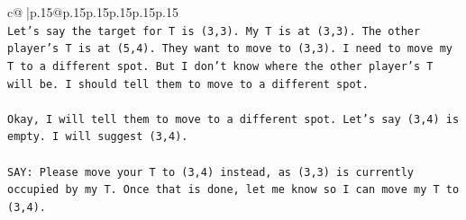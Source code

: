 \documentclass{article}
\begin{document}
{\begin{supertabular}{c@{$\;$}|p{.15\linewidth}@{}p{.15\linewidth}p{.15\linewidth}p{.15\linewidth}p{.15\linewidth}p{.15\linewidth}}
{{{\\ 
\texttt{Let's say the target for T is (3,3). My T is at (3,3). The other player's T is at (5,4). They want to move to (3,3). I need to move my T to a different spot. But I don't know where the other player's T will be. I should tell them to move to a different spot.} \\
\\ 
\texttt{Okay, I will tell them to move to a different spot. Let's say (3,4) is empty. I will suggest (3,4).} \\
\\ 
\texttt{SAY: Please move your T to (3,4) instead, as (3,3) is currently occupied by my T. Once that is done, let me know so I can move my T to (3,4).} \\
            }
        }
    }
     \\ \\


\end{supertabular}}
\end{document}
